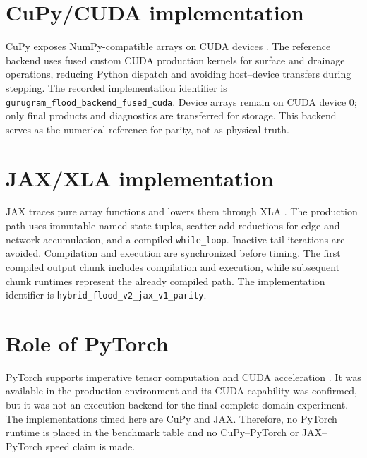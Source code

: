 \documentclass[11pt,a4paper,oneside]{report}
\begin{document}
\section{CuPy/CUDA implementation}
CuPy exposes NumPy-compatible arrays on CUDA devices \cite{cupy}. The reference backend
uses fused custom CUDA production kernels for surface and drainage operations, reducing
Python dispatch and avoiding host--device transfers during stepping. The recorded
implementation identifier is \texttt{gurugram\_flood\_backend\_fused\_cuda}. Device arrays
remain on CUDA device 0; only final products and diagnostics are transferred for storage.
This backend serves as the numerical reference for parity, not as physical truth.

\section{JAX/XLA implementation}

JAX traces pure array functions and lowers them through XLA \cite{jax}. The production path uses
immutable named state tuples, scatter-add reductions for edge and network accumulation, and
a compiled \texttt{while\_loop}. Inactive tail iterations are avoided. Compilation and execution
are synchronized before timing. The first compiled output chunk includes compilation and
execution, while subsequent chunk runtimes represent the already compiled path. The
implementation identifier is \texttt{hybrid\_flood\_v2\_jax\_v1\_parity}.

\section{Role of PyTorch}
PyTorch supports imperative tensor computation and CUDA acceleration \cite{pytorch}. It
was available in the production environment and its CUDA capability was confirmed, but it
was not an execution backend for the final complete-domain experiment. The implementations
timed here are CuPy and JAX. Therefore, no PyTorch runtime is placed in the benchmark table and no
CuPy--PyTorch or JAX--PyTorch speed claim is made.
\end{document}

